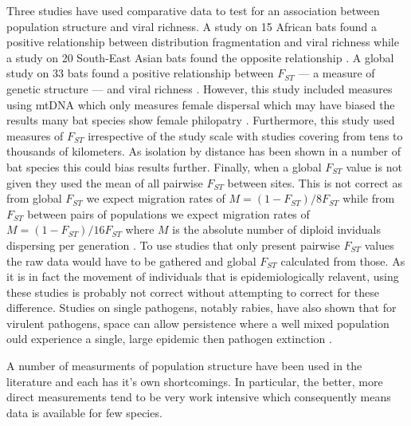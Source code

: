 
Three studies have used comparative data to test for an association between population structure and viral richness.
A study on 15 African bats found a positive relationship between distribution fragmentation and viral richness \cite{maganga2014bat} while a study on 20 South-East Asian bats found the opposite relationship \cite{gay2014parasite}. 
A global study on 33 bats found a positive relationship between $F_{ST}$ --- a measure of genetic structure --- and viral richness \cite{turmelle2009correlates}. 
However, this study included measures using mtDNA which only measures female dispersal which may have biased the results many bat species show female philopatry \cite{kerth2002extreme, hulva2010mechanisms}.
Furthermore, this study used measures of $F_{ST}$ irrespective of the study scale with studies covering from tens \cite{mccracken1981social} to thousands \cite{petit1999male} of kilometers.
As isolation by distance has been shown in a number of bat species \cite{burland1999population, hulva2010mechanisms, o2015genetic, vonhof2015range} this could bias results further.
Finally, when a global $F_{ST}$ value is not given they used the mean of all pairwise $F_{ST}$ between sites.
This is not correct as from global $F_{ST}$ we expect migration rates of $M = (1-F_{ST})/8F_{ST}$ while from $F_{ST}$ between pairs of populations we expect migration rates of $M = (1-F_{ST})/16F_{ST}$ where $M$ is the absolute number of diploid inviduals dispersing per generation \cite{slatkin1995measure}.
To use studies that only present pairwise $F_{ST}$ values the raw data would have to be gathered and global $F_{ST}$ calculated from those.
As it is in fact the movement of individuals that is epidemiologically relavent, using these studies is probably not correct without attempting to correct for these difference.
Studies on single pathogens, notably rabies, have also shown that for virulent pathogens, space can allow persistence where a well mixed population ould experience a single, large epidemic then pathogen extinction \cite{blackwood2013resolving, pons2014insights}.



A number of measurments of population structure have been used in the literature and each has it's own shortcomings.
In particular, the better, more direct measurements tend to be very work intensive which consequently means data is available for few species.


